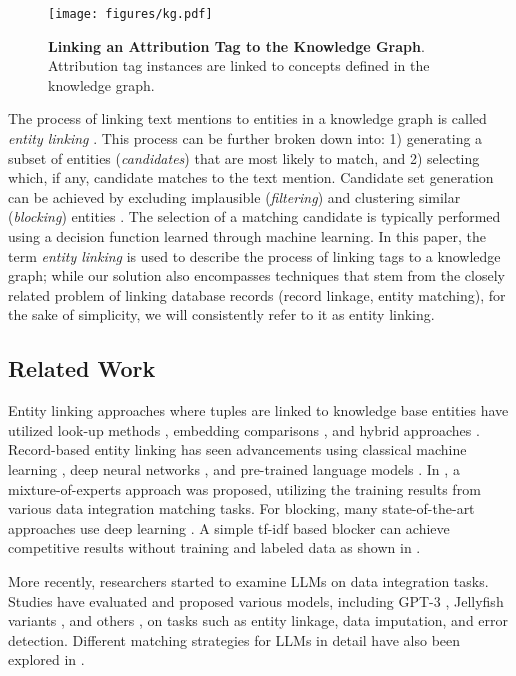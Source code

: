 \begin{figure}
    \centering
    \texttt{[image: figures/kg.pdf]}
    \caption{\textbf{Linking an Attribution Tag to the Knowledge Graph}. Attribution tag instances are linked to concepts defined in the knowledge graph.}
    \label{fig:knowledge-graph}
\end{figure}

The process of linking text mentions to entities in a knowledge graph is called \emph{entity linking} \cite{Shen2015}. This process can be further broken down into: 1) generating a subset of entities (\emph{candidates}) that are most likely to match, and 2) selecting which, if any, candidate matches to the text mention. Candidate set generation can be achieved by excluding implausible (\emph{filtering}) and clustering similar (\emph{blocking}) entities \cite{Papadakis2020}. The selection of a matching candidate is typically performed using a decision function learned through machine learning. In this paper, the term \emph{entity linking} is used to describe the process of linking tags to a knowledge graph; while our solution also encompasses techniques that stem from the closely related problem of linking database records (record linkage, entity matching), for the sake of simplicity, we will consistently refer to it as entity linking.

\subsection{Related Work}

Entity linking approaches where tuples are linked to knowledge base entities have utilized look-up methods \cite{Ritze2015}, embedding comparisons \cite{Deng2020}, and hybrid approaches \cite{Efthymiou2017}. Record-based entity linking has seen advancements using classical machine learning \cite{Konda2016}, deep neural networks \cite{Mudgal2018}, and pre-trained language models \cite{Li2020}. In \cite{Tu2023}, a mixture-of-experts approach was proposed, utilizing the training results from various data integration matching tasks. For blocking, many state-of-the-art approaches use deep learning \cite{Li2020, Thirumuruganathan2021, Wang2023, Brinkmann2024}. A simple tf-idf based blocker can achieve competitive results without training and labeled data as shown in \cite{Paulsen2023}.

More recently, researchers started to examine LLMs on data integration tasks. Studies have evaluated and proposed various models, including GPT-3 \cite{Narayan2022}, Jellyfish variants \cite{Zhang2024}, and others \cite{Peeters2024}, on tasks such as entity linkage, data imputation, and error detection. Different matching strategies for LLMs in detail have also been explored in \cite{Peeters2024, Wang2024}.

